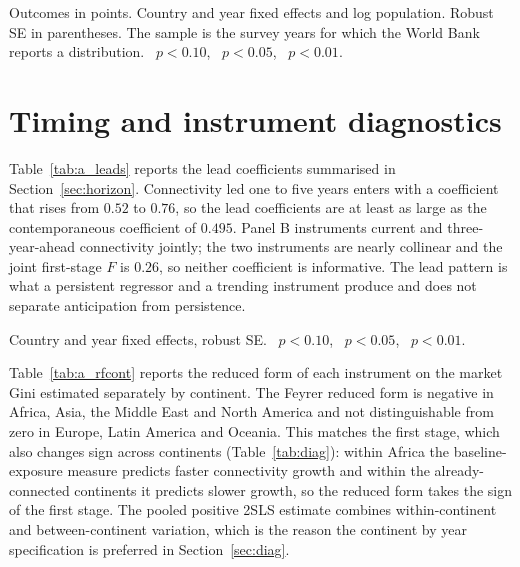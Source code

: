\begin{table}[H]\centering\caption{Survey-based inequality measures (World Bank Poverty and Inequality Platform).}\label{tab:a_altdv}
\begin{threeparttable}\small
\begin{tablenotes}\footnotesize\item Outcomes in points. Country and year fixed effects and log population. Robust SE in parentheses. The sample is the survey years for which the World Bank reports a distribution. \sym{*}~$p<0.10$, \sym{**}~$p<0.05$, \sym{***}~$p<0.01$.\end{tablenotes}\end{threeparttable}\end{table}

\section{Timing and instrument diagnostics}
\label{app:timing}
Table~\ref{tab:a_leads} reports the lead coefficients summarised in Section~\ref{sec:horizon}. Connectivity led one to five years enters with a coefficient that rises from $0.52$ to $0.76$, so the lead coefficients are at least as large as the contemporaneous coefficient of $0.495$. Panel B instruments current and three-year-ahead connectivity jointly; the two instruments are nearly collinear and the joint first-stage $F$ is $0.26$, so neither coefficient is informative. The lead pattern is what a persistent regressor and a trending instrument produce and does not separate anticipation from persistence.

\begin{table}[H]\centering\caption{Leads of connectivity.}\label{tab:a_leads}
\begin{threeparttable}\small
\begin{tablenotes}\footnotesize\item Country and year fixed effects, robust SE. \sym{*}~$p<0.10$, \sym{**}~$p<0.05$, \sym{***}~$p<0.01$.\end{tablenotes}\end{threeparttable}\end{table}

Table~\ref{tab:a_rfcont} reports the reduced form of each instrument on the market Gini estimated separately by continent. The Feyrer reduced form is negative in Africa, Asia, the Middle East and North America and not distinguishable from zero in Europe, Latin America and Oceania. This matches the first stage, which also changes sign across continents (Table~\ref{tab:diag}): within Africa the baseline-exposure measure predicts faster connectivity growth and within the already-connected continents it predicts slower growth, so the reduced form takes the sign of the first stage. The pooled positive 2SLS estimate combines within-continent and between-continent variation, which is the reason the continent by year specification is preferred in Section~\ref{sec:diag}.

